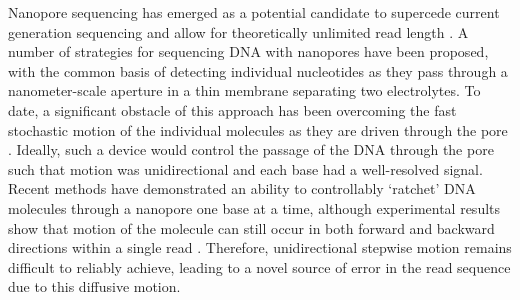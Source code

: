 \documentclass{biophys_letter}
\begin{document}
Nanopore sequencing has emerged as a potential candidate to supercede current generation sequencing and allow for theoretically unlimited read length \cite{Branton:2008}.
A number of strategies for sequencing DNA with nanopores have been proposed, with the common basis of detecting individual nucleotides as they pass through a nanometer-scale aperture in a thin membrane separating two electrolytes.
To date, a significant obstacle of this approach has been overcoming the fast stochastic motion of the individual molecules as they are driven through the pore \cite{Venkatesan:2011, Lu:2011}.
Ideally, such a device would control the passage of the DNA through the pore such that motion was unidirectional and each base had a well-resolved signal.
Recent methods have demonstrated an ability to controllably `ratchet' DNA molecules through a nanopore one base at a time, although experimental results show that motion of the molecule can still occur in both forward and backward directions within a single read \cite{Luan:2011, Olasagasti:2010, Cherf:2012}.
Therefore, unidirectional stepwise motion remains difficult to reliably achieve, leading to a novel source of error in the read sequence due to this diffusive motion.
\end{document}
